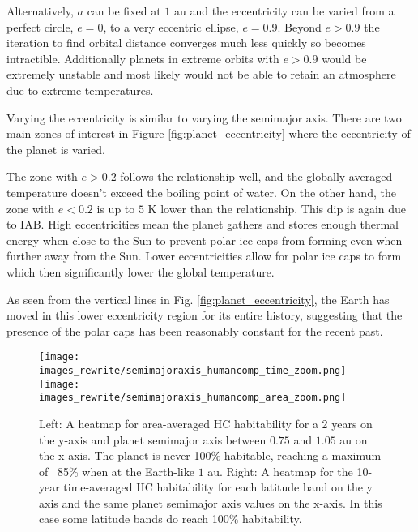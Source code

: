 \documentclass[12pt, onecolumn]{revtex4-2}    %
\begin{document}
Alternatively, $a$ can be fixed at $1$ au and the eccentricity can be varied from a perfect circle, $e = 0$, to a very eccentric ellipse, $e = 0.9$.
Beyond $e > 0.9$ the iteration to find orbital distance converges much less quickly so becomes intractible.
Additionally planets in extreme orbits with $e > 0.9$ would be extremely unstable and most likely would not be able to retain an atmosphere due to extreme temperatures.

Varying the eccentricity is similar to varying the semimajor axis.
There are two main zones of interest in Figure \ref{fig:planet_eccentricity} where the eccentricity of the planet is varied.

The zone with $e > 0.2$ follows the relationship well, and the globally averaged temperature doesn't exceed the boiling point of water.
On the other hand, the zone with $e < 0.2$ is up to $5$ K lower than the relationship.
This dip is again due to IAB.
High eccentricities mean the planet gathers and stores enough thermal energy when close to the Sun to prevent polar ice caps from forming even when further away from the Sun.
Lower eccentricities allow for polar ice caps to form which then significantly lower the global temperature.

As seen from the vertical lines in Fig. \ref{fig:planet_eccentricity}, the Earth has moved in this lower eccentricity region for its entire history, suggesting that the presence of the polar caps has been reasonably constant for the recent past.

\begin{figure}[t]
  \texttt{[image: images\_rewrite/semimajoraxis\_humancomp\_time\_zoom.png]}
  \texttt{[image: images\_rewrite/semimajoraxis\_humancomp\_area\_zoom.png]}
  \caption{
    Left: A heatmap for area-averaged HC habitability for a 2 years on the y-axis and planet semimajor axis between $0.75$ and $1.05$ au on the x-axis.
    The planet is never 100\% habitable, reaching a maximum of ~85\% when at the Earth-like $1$ au.
    Right: A heatmap for the 10-year time-averaged HC habitability for each latitude band on the y axis and the same planet semimajor axis values on the x-axis.
    In this case some latitude bands do reach 100\% habitability.
  }
  \label{fig:qualitative_semimajoraxis}
\end{figure}
\end{document}
